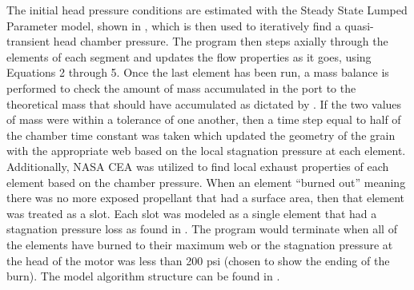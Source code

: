 The initial head pressure conditions are estimated with the Steady State Lumped Parameter model, shown in , which is then used to iteratively find a quasi-transient head chamber pressure. The program then steps axially through the elements of each segment and updates the flow properties as it goes, using Equations 2 through 5. Once the last element has been run, a mass balance is performed to check the amount of mass accumulated in the port to the theoretical mass that should have accumulated as dictated by . If the two values of mass were within a tolerance of one another, then a time step equal to half of the chamber time constant was taken which updated the geometry of the grain with the appropriate web based on the local stagnation pressure at each element. Additionally, NASA CEA was utilized to find local exhaust properties of each element based on the chamber pressure. When an element ``burned out'' meaning there was no more exposed propellant that had a surface area, then that element was treated as a slot. Each slot was modeled as a single element that had a stagnation pressure loss as found in \cite{heister-paper}. The program would terminate when all of the elements have burned to their maximum web or the stagnation pressure at the head of the motor was less than 200 psi (chosen to show the ending of the burn). The model algorithm structure can be found in .

